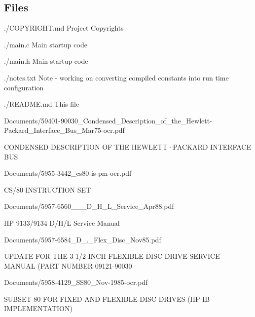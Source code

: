 \subsection*{Files}


\begin{DoxyItemize}
\item ./\+C\+O\+P\+Y\+R\+I\+G\+HT.md Project Copyrights
\item ./main.c Main startup code
\item ./main.h Main startup code
\item ./notes.txt Note -\/ working on converting compiled constants into run time configuration
\item ./\+R\+E\+A\+D\+ME.md This file
\item Documents/59401-\/90030\+\_\+\+Condensed\+\_\+\+Description\+\_\+of\+\_\+the\+\_\+\+Hewlett-\/\+Packard\+\_\+\+Interface\+\_\+\+Bus\+\_\+\+Mar75-\/ocr.\+pdf
\begin{DoxyItemize}
\item C\+O\+N\+D\+E\+N\+S\+ED D\+E\+S\+C\+R\+I\+P\+T\+I\+ON OF T\+HE H\+E\+W\+L\+E\+T\+T·\+P\+A\+C\+K\+A\+RD I\+N\+T\+E\+R\+F\+A\+CE B\+US
\end{DoxyItemize}
\item Documents/5955-\/3442\+\_\+cs80-\/is-\/pm-\/ocr.\+pdf
\begin{DoxyItemize}
\item C\+S/80 I\+N\+S\+T\+R\+U\+C\+T\+I\+ON S\+ET
\end{DoxyItemize}
\item Documents/5957-\/6560\+\_\+\_\+\_\+\+D\+\_\+\+H\+\_\+\+L\+\_\+\+Service\+\_\+\+Apr88.\+pdf
\begin{DoxyItemize}
\item HP 9133/9134 D/\+H/L Service Manual
\end{DoxyItemize}
\item Documents/5957-\/6584\+\_\+D\+\_.\+\_\+\+Flex\+\_\+\+Disc\+\_\+\+Nov85.\+pdf
\begin{DoxyItemize}
\item U\+P\+D\+A\+TE F\+OR T\+HE 3 1/2-\/\+I\+N\+CH F\+L\+E\+X\+I\+B\+LE D\+I\+SC D\+R\+I\+VE S\+E\+R\+V\+I\+CE M\+A\+N\+U\+AL (P\+A\+RT N\+U\+M\+B\+ER 09121-\/90030
\end{DoxyItemize}
\item Documents/5958-\/4129\+\_\+\+S\+S80\+\_\+\+Nov-\/1985-\/ocr.\+pdf
\begin{DoxyItemize}
\item S\+U\+B\+S\+ET 80 F\+OR F\+I\+X\+ED A\+ND F\+L\+E\+X\+I\+B\+LE D\+I\+SC D\+R\+I\+V\+ES (H\+P-\/\+IB I\+M\+P\+L\+E\+M\+E\+N\+T\+A\+T\+I\+ON)

\end{DoxyItemize}
\end{DoxyItemize}
